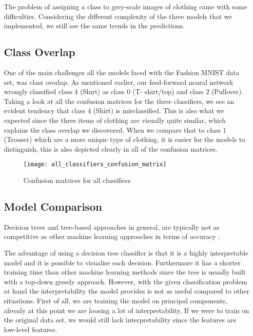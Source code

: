 \documentclass[../main.tex]{subfiles}
\begin{document}
The problem of assigning a class to grey-scale images of clothing 
came with some difficulties.
Considering the different complexity of the three models 
that we implemented, we still see the same trends in the predictions.


\subsection{Class Overlap}

One of the main challenges all the models faced with the Fashion MNIST 
data set, was class overlap. As mentioned earlier, our feed-forward 
neural network wrongly classified class $4$ (Shirt) as class $0$ (T-
shirt/top) and class $2$ (Pullover). Taking a look at 
all the confusion matrices for the three classifiers, we see an 
evident tendency that class $4$ (Shirt) is misclassified. This is 
also what we expected since the three items of clothing are visually 
quite similar, which explains the class overlap we discovered. When 
we compare that to class $1$ (Trouser) which are a more unique 
type of clothing, it is easier for the models to distinguish, this is 
also depicted clearly in all of the confusion matrices.

\begin{figure}[ht]
    \centering
    \texttt{[image: all\_classifiers\_confusion\_matrix]}
    \caption{Confusion matrices for all classifiers}
    \label{fig:all-confusion-matrices}
\end{figure}


\subsection{Model Comparison}

Decision trees and tree-based approaches in general, are typically 
not as competitive as other machine learning approaches in terms of 
accuracy \autocite{JamesStatisticalLearning}. 

The advantage of using a decision tree classifier is that it is a 
highly interpretable model and it is possible to visualise each 
decision. Furthermore it has a shorter training time than other 
machine learning methods since the tree is usually built with 
a top-down greedy approach. 
However, with the given classification problem at hand the 
interpretability the model provides is not as useful compared to 
other situations. First of all, we are training the model on 
principal components, already at this point we are loosing a lot 
of interpretability. 
If we were to train on the original data set, we 
would still lack interpretability since the features are low-level 
features. 
\end{document}
